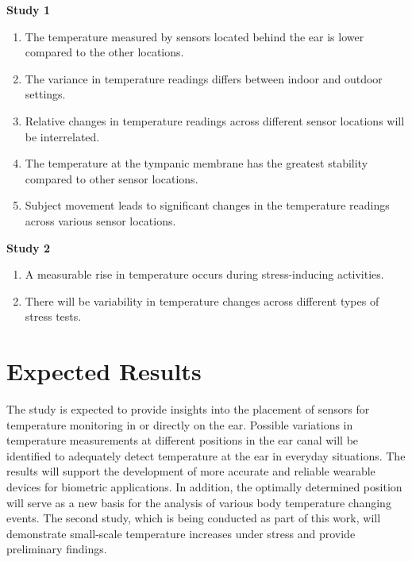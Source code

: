 \textbf{Study 1}
\begin{enumerate}[label=H\arabic{*}:]
  \item The temperature measured by sensors located behind the ear is lower compared to the other locations.
  \item The variance in temperature readings differs between indoor and outdoor settings.
  \item Relative changes in temperature readings across different sensor locations will be interrelated.
  \item The temperature at the tympanic membrane has the greatest stability compared to other sensor locations.
  \item Subject movement leads to significant changes in the temperature readings across various sensor locations.
\end{enumerate}

\textbf{Study 2}
\begin{enumerate}[label=H\arabic{*}:]
  \item A measurable rise in temperature occurs during stress-inducing activities.
  \item There will be variability in temperature changes across different types of stress tests.
\end{enumerate}

\section{Expected Results}
\label{ch:Introduction:ExpectedResults}
The study is expected to provide insights into the placement of sensors for temperature monitoring in or directly on the ear.
Possible variations in temperature measurements at different positions in the ear canal will be identified to adequately detect temperature at the ear in everyday situations.
The results will support the development of more accurate and reliable wearable devices for biometric applications. 
In addition, the optimally determined position will serve as a new basis for the analysis of various body temperature changing events.
The second study, which is being conducted as part of this work, will demonstrate small-scale temperature increases under stress and provide preliminary findings.